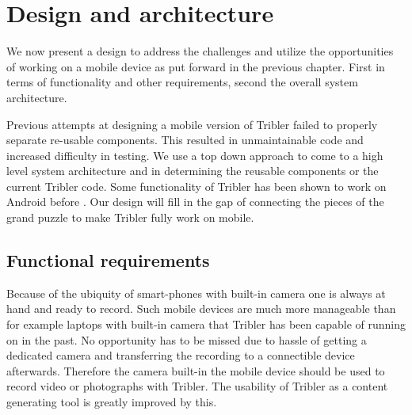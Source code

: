 \chapter{Design and architecture}
\label{ch:design}

We now present a design to address the challenges and utilize the opportunities of working on a mobile device as put forward in the previous chapter.
First in terms of functionality and other requirements, second the overall system architecture.

Previous attempts at designing a mobile version of Tribler failed to properly separate re-usable components.
This resulted in unmaintainable code and increased difficulty in testing.
We use a top down approach to come to a high level system architecture and in determining the reusable components or the current Tribler code.
Some functionality of Tribler has been shown to work on Android before \cite{bsc1,2,3}.
Our design will fill in the gap of connecting the pieces of the grand puzzle to make Tribler fully work on mobile.


\section{Functional requirements}


Because of the ubiquity of smart-phones with built-in camera one is always at hand and ready to record.
Such mobile devices are much more manageable than for example laptops with built-in camera that Tribler has been capable of running on in the past.
No opportunity has to be missed due to hassle of getting a dedicated camera and transferring the recording to a connectible device afterwards.
Therefore the camera built-in the mobile device should be used to record video or photographs with Tribler.
The usability of Tribler as a content generating tool is greatly improved by this. 

